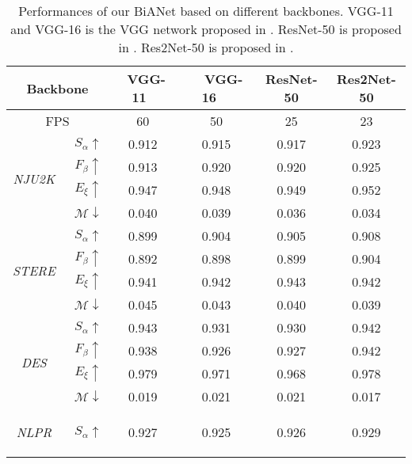 \documentclass[journal]{IEEEtran}
\newcommand{\NJU}{\textit{NJU2K}~\cite{ju2014depth}}
\newcommand{\NLPR}{\textit{NLPR}~\cite{peng2014rgbd}}
\newcommand{\STERE}{\textit{STERE}~\cite{niu2012leveraging}}
\newcommand{\DES}{\textit{DES}~\cite{cheng2014depth}}
\begin{document}
\begin{table}[t]
	\centering
	\small
\renewcommand{\arraystretch}{1.25}
	\renewcommand{\tabcolsep}{0.7mm}
    \caption{Performances of our BiANet based on different backbones. VGG-11 and VGG-16 is the VGG network proposed in \cite{simonyan2015vgg}.
    ResNet-50 is proposed in \cite{he2016deep}.
    Res2Net-50 is proposed in \cite{gao2019res2net}.
	}
	\begin{tabular}{cc|cccc}
		\hline\toprule
		\multicolumn{2}{c|}{Backbone} & ~VGG-11~ & ~~VGG-16~~ & ResNet-50 & Res2Net-50 \\
		\hline
		\multicolumn{2}{c|}{FPS}  & 60 & 50 & 25 & 23   \\
		\hline
		\multirow{4}{*}{\begin{sideways}\NJU\end{sideways}}
		& $S_{\alpha}\uparrow$    & 0.912 & 0.915 & 0.917 & 0.923   \\
		& $F_{\beta}\uparrow$     & 0.913 & 0.920 & 0.920 & 0.925   \\
		& $E_{\xi}\uparrow$       & 0.947 & 0.948 & 0.949 & 0.952   \\
		& $\mathcal{M}\downarrow$ & 0.040 & 0.039 & 0.036 & 0.034   \\
		\hline
		\multirow{4}{*}{\begin{sideways}\STERE\end{sideways}}
		& $S_{\alpha}\uparrow$    & 0.899 & 0.904 & 0.905 & 0.908   \\
		& $F_{\beta}\uparrow$     & 0.892 & 0.898 & 0.899 & 0.904   \\
		& $E_{\xi}\uparrow$       & 0.941 & 0.942 & 0.943 & 0.942   \\
		& $\mathcal{M}\downarrow$ & 0.045 & 0.043 & 0.040 & 0.039   \\
		\hline
		\multirow{4}{*}{\begin{sideways}\DES\end{sideways}}
		& $S_{\alpha}\uparrow$    & 0.943 & 0.931 & 0.930 & 0.942  \\
		& $F_{\beta}\uparrow$     & 0.938 & 0.926 & 0.927 & 0.942  \\
		& $E_{\xi}\uparrow$       & 0.979 & 0.971 & 0.968 & 0.978  \\
		& $\mathcal{M}\downarrow$ & 0.019 & 0.021 & 0.021 & 0.017  \\
		\hline
		\multirow{4}{*}{\begin{sideways}\NLPR\end{sideways}}
		& $S_{\alpha}\uparrow$    & 0.927 & 0.925 & 0.926 & 0.929  \\

\end{tabular}
\end{table}
\end{document}

